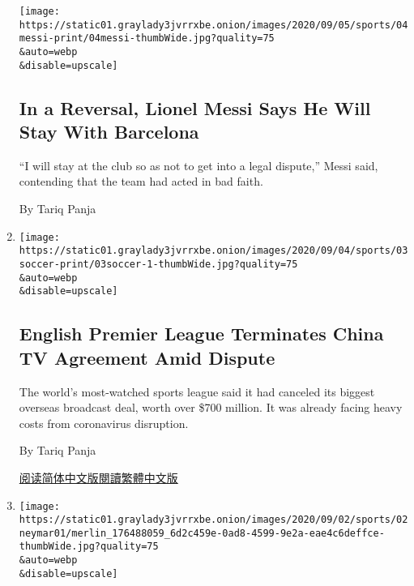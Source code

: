 \begin{enumerate}
  \texttt{[image: https://static01.graylady3jvrrxbe.onion/images/2020/09/05/sports/04messi-print/04messi-thumbWide.jpg?quality=75\\\&auto=webp\\\&disable=upscale]}

  \hypertarget{in-a-reversal-lionel-messi-says-he-will-stay-with-barcelona}{%
  \subsection{In a Reversal, Lionel Messi Says He Will Stay With
  Barcelona}\label{in-a-reversal-lionel-messi-says-he-will-stay-with-barcelona}}

  ``I will stay at the club so as not to get into a legal dispute,''
  Messi said, contending that the team had acted in bad faith.

  By Tariq Panja
\item
  \href{/2020/09/03/sports/soccer/premier-league-china-contract-television.html}{}

  \texttt{[image: https://static01.graylady3jvrrxbe.onion/images/2020/09/04/sports/03soccer-print/03soccer-1-thumbWide.jpg?quality=75\\\&auto=webp\\\&disable=upscale]}

  \hypertarget{english-premier-league-terminates-china-tv-agreement-amid-dispute}{%
  \subsection{English Premier League Terminates China TV Agreement Amid
  Dispute}\label{english-premier-league-terminates-china-tv-agreement-amid-dispute}}

  The world's most-watched sports league said it had canceled its
  biggest overseas broadcast deal, worth over \$700 million. It was
  already facing heavy costs from coronavirus disruption.

  By Tariq Panja

  \href{https://cn.nytimes3xbfgragh.onion/sports/20200904/premier-league-china-contract-television/}{阅读简体中文版}\href{https://cn.nytimes3xbfgragh.onion/sports/20200904/premier-league-china-contract-television/zh-hant/}{閱讀繁體中文版}
\item
  \href{/2020/09/02/sports/soccer/neymar-PSG-coronavirus.html}{}

  \texttt{[image: https://static01.graylady3jvrrxbe.onion/images/2020/09/02/sports/02neymar01/merlin\_176488059\_6d2c459e-0ad8-4599-9e2a-eae4c6deffce-thumbWide.jpg?quality=75\\\&auto=webp\\\&disable=upscale]}

  \hypertarget{paris-st-germain-star-neymar-tests-positive-for-coronavirus}{%
}
\end{enumerate}
